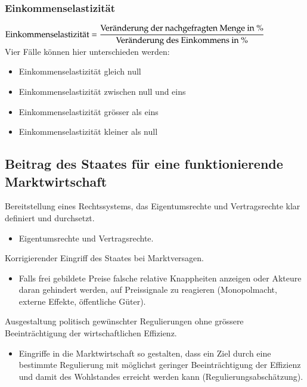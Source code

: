 \subsubsection{Einkommenselastizität}
$\textnormal{Einkommenselastizität} = \dfrac{\textnormal{Veränderung der nachgefragten Menge in \%}}{\textnormal{Veränderung des Einkommens in \%}}$\\
\vspace{\baselineskip}
Vier Fälle können hier unterschieden werden:
\begin{itemize}
	\item Einkommenselastizität gleich null
	\item Einkommenselastizität zwischen null und eins
	\item Einkommenselastizität grösser als eins
	\item Einkommenselastizität kleiner als null
\end{itemize}

\subsection{Beitrag des Staates für eine funktionierende Marktwirtschaft}
Bereitstellung eines Rechtssystems, das Eigentumsrechte und Vertragsrechte klar definiert und durchsetzt.
\begin{itemize}
	\item Eigentumsrechte und Vertragsrechte.
\end{itemize}
Korrigierender Eingriff des Staates bei Marktversagen.
\begin{itemize}
	\item Falls frei gebildete Preise falsche relative Knappheiten anzeigen oder Akteure daran gehindert werden, auf Preissignale zu reagieren (Monopolmacht, externe Effekte, öffentliche Güter).
\end{itemize}
Ausgestaltung politisch gewünschter Regulierungen ohne grössere Beeinträchtigung der wirtschaftlichen Effizienz.
\begin{itemize}
	\item Eingriffe in die Marktwirtschaft so gestalten, dass ein Ziel durch eine bestimmte Regulierung mit möglichst geringer Beeinträchtigung der Effizienz und damit des Wohlstandes erreicht werden kann (Regulierungsabschätzung).
\end{itemize}

